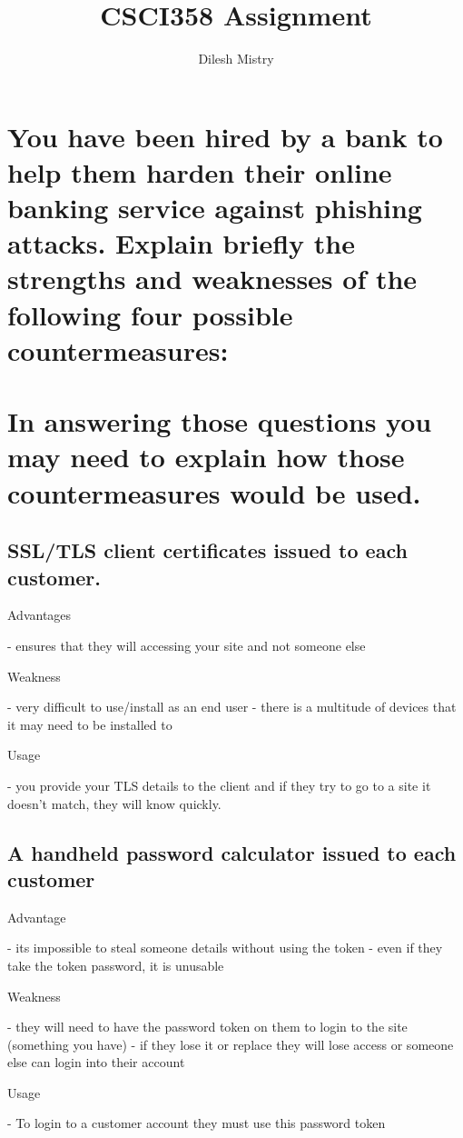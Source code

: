 \documentclass{article}
\title{CSCI358 Assignment}
\author{Dilesh Mistry}
\begin{document}
\maketitle

\tableofcontents

\section[Banking]{You have been hired by a bank to help them harden their online banking service against phishing
attacks. Explain briefly the strengths and weaknesses of the following four possible countermeasures:
\\\\
In answering those questions you may need to explain how those countermeasures would be used.}

\subsection[SSL/TLS]{SSL/TLS client certificates issued to each customer.}

Advantages

- ensures that they will accessing your site and not someone else

Weakness

- very difficult to use/install as an end user
- there is a multitude of devices that it may need to be installed to

Usage

- you provide your TLS details to the client and if they try to go to a site it doesn't match, they will know quickly.

\subsection[Password Calculator]{A handheld password calculator issued to each customer}
Advantage

- its impossible to steal someone details without using the token
- even if they take the token password, it is unusable  

Weakness 

- they will need to have the password token on them to login to the site (something you have)
- if they lose it or replace they will lose access or someone else can login into their account  

Usage

- To login to a customer account they must use this password token
\end{document}
